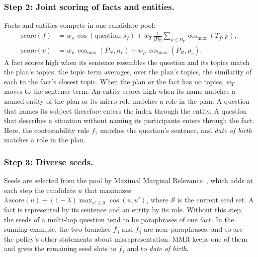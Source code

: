 \documentclass[sigconf, review, anonymous]{acmart}
\newcommand{\simcos}{\operatorname{cos}}
\begin{document}
\subsubsection*{Step 2: Joint scoring of facts and entities.}
Facts and entities compete in one candidate pool:
\begin{align*}
  \mathrm{score}(f) &= w_s\, \simcos(\text{question}, s_f) + w_T\, \tfrac{1}{|P_T|}\textstyle\sum_{p \in P_T} \simcos_{\max}(T_f, p), \\
  \mathrm{score}(v) &= w_n\, \simcos_{\max}(P_N, n_v) + w_\rho\, \simcos_{\max}(P_R, \rho_v).
\end{align*}
A fact scores high when its sentence resembles the question and its topics match the plan's topics; the topic term averages, over the plan's topics, the similarity of each to the fact's closest topic. When the plan or the fact has no topics, $w_T$ moves to the sentence term. An entity scores high when its name matches a named entity of the plan or its micro-role matches a role in the plan. A question that names its subject therefore enters the index through the entity. A question that describes a situation without naming its participants enters through the fact. Here, the contestability rule $f_1$ matches the question's sentence, and \emph{date of birth} matches a role in the plan.

\subsubsection*{Step 3: Diverse seeds.}
Seeds are selected from the pool by Maximal Marginal Relevance~\cite{carbonell1998use}, which adds at each step the candidate $u$ that maximizes
$\lambda\, \mathrm{score}(u) - (1 - \lambda) \max_{u' \in \mathcal{S}} \simcos(u, u')$,
where $\mathcal{S}$ is the current seed set. A fact is represented by its sentence and an entity by its role. Without this step, the seeds of a multi-hop question tend to be paraphrases of one fact. In the running example, the two branches $f_3$ and $f_4$ are near-paraphrases, and so are the policy's other statements about misrepresentation. MMR keeps one of them and gives the remaining seed slots to $f_1$ and to \emph{date of birth}.
\end{document}
